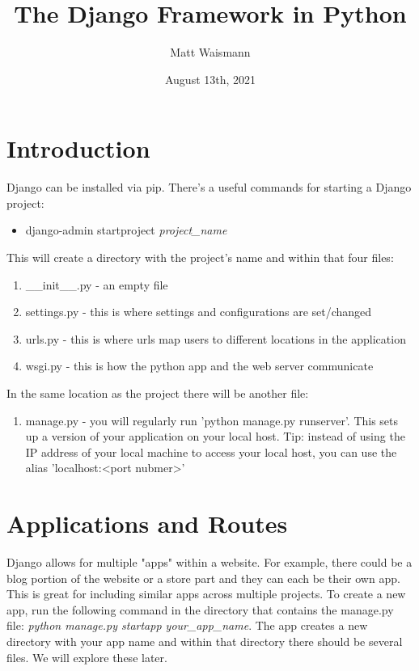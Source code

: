 \documentclass{article}%
\title{The Django Framework in Python}
\date{August 13th, 2021}
\author{Matt Waismann}
\begin{document}
\maketitle
\section{Introduction}
Django can be installed via pip. There's a useful commands for starting a Django project:
\begin{itemize}
    \item django-admin startproject \textit{project\_name}
\end{itemize}
This will create a directory with the project's name and within that four files:
\begin{enumerate}
    \item \_\_init\_\_.py - an empty file 
    \item settings.py - this is where settings and configurations are set/changed
    \item urls.py - this is where urls map users to different locations in the application 
    \item wsgi.py - this is how the python app and the web server communicate
\end{enumerate}
In the same location as the project there will be another file:
\begin{enumerate}
    \item manage.py - you will regularly run 'python manage.py runserver'. This sets up a version of your application on your local host.
     Tip: instead of using the IP address of your local machine to access your local host, you can use the alias 'localhost:<port nubmer>'
\end{enumerate}

\section{Applications and Routes}
Django allows for multiple "apps" within a website. For example, there could be a blog portion of the website or a store part and they can each be their own app. This is great for including similar apps across multiple projects. To create a new app, run the following command in the
directory that contains the manage.py file: \textit{python manage.py startapp your\_app\_name}. The app creates a new directory with your app name and within that directory there should be several files. We will explore these later. \\ \\
\end{document}
